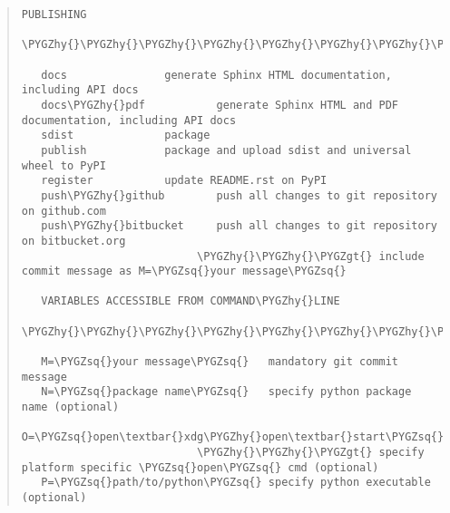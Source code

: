 \documentclass[letterpaper,10pt,english]{sphinxmanual}
\def\PYGZgt{\char`\>}
\def\PYGZhy{\char`\-}
\def\PYGZsq{\char`\'}
\begin{document}
\begin{quote}
\begin{Verbatim}[commandchars=\\\{\}]
   PUBLISHING
   \PYGZhy{}\PYGZhy{}\PYGZhy{}\PYGZhy{}\PYGZhy{}\PYGZhy{}\PYGZhy{}\PYGZhy{}\PYGZhy{}\PYGZhy{}

   docs               generate Sphinx HTML documentation, including API docs
   docs\PYGZhy{}pdf           generate Sphinx HTML and PDF documentation, including API docs
   sdist              package
   publish            package and upload sdist and universal wheel to PyPI
   register           update README.rst on PyPI
   push\PYGZhy{}github        push all changes to git repository on github.com
   push\PYGZhy{}bitbucket     push all changes to git repository on bitbucket.org
                           \PYGZhy{}\PYGZhy{}\PYGZgt{} include commit message as M=\PYGZsq{}your message\PYGZsq{}

   VARIABLES ACCESSIBLE FROM COMMAND\PYGZhy{}LINE
   \PYGZhy{}\PYGZhy{}\PYGZhy{}\PYGZhy{}\PYGZhy{}\PYGZhy{}\PYGZhy{}\PYGZhy{}\PYGZhy{}\PYGZhy{}\PYGZhy{}\PYGZhy{}\PYGZhy{}\PYGZhy{}\PYGZhy{}\PYGZhy{}\PYGZhy{}\PYGZhy{}\PYGZhy{}\PYGZhy{}\PYGZhy{}\PYGZhy{}\PYGZhy{}\PYGZhy{}\PYGZhy{}\PYGZhy{}\PYGZhy{}\PYGZhy{}\PYGZhy{}\PYGZhy{}\PYGZhy{}\PYGZhy{}\PYGZhy{}\PYGZhy{}\PYGZhy{}\PYGZhy{}\PYGZhy{}\PYGZhy{}

   M=\PYGZsq{}your message\PYGZsq{}   mandatory git commit message
   N=\PYGZsq{}package name\PYGZsq{}   specify python package name (optional)
   O=\PYGZsq{}open\textbar{}xdg\PYGZhy{}open\textbar{}start\PYGZsq{}
                           \PYGZhy{}\PYGZhy{}\PYGZgt{} specify platform specific \PYGZsq{}open\PYGZsq{} cmd (optional)
   P=\PYGZsq{}path/to/python\PYGZsq{} specify python executable (optional)
\end{Verbatim}
\end{quote}
\end{document}
